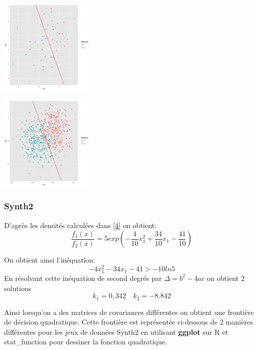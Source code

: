 \documentclass[10pt]{article}
\begin{document}
			\begin{minipage}{.5\textwidth}
	\includegraphics[width=45mm]{Figures/Exo2/linear_synth140.png}
	\label{fig:front_ceuc}
\end{minipage}%
\hspace{0.02\linewidth}
\begin{minipage}{.5\textwidth}
	\includegraphics[width=45mm]{Figures/Exo2/linear_synth1500.png}
	\label{fig:front_kppv}
\end{minipage}

\subsubsection{Synth2}
D'après les densités calculées dans \eqref{4} on obtient: \[\frac{f_{1}(x)}{f_{2}(x)} = 5exp(-\frac{4}{10}x_{1}^{2} + \frac{34}{10} x_{1} - \frac{41}{10})\]

On obtient ainsi l'inéquation: \[-4x_{1}^{2}  - 34x_{1} - 41 > -10ln5\]
En résolvant cette inéquation de second degrés par $\Delta = b^{2} - 4ac$ on obtient 2 solutions
\[k_{1} = 0,342 \quad k_{2} = -8.842 \]

Ainsi lorsqu'on a des matrices de covariances différentes on obtient une frontière de décision quadratique. Cette frontière est représentée  ci-dessous de 2 manières différentes pour les jeux de données Synth2 en utilisant \textbf{ggplot\textit{}} sur R et stat\_function pour dessiner la fonction quadratique.\\
\end{document}
